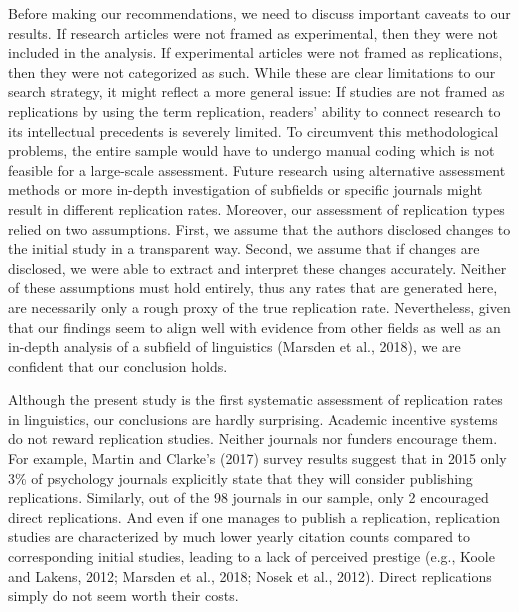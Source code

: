 \documentclass[]{elsarticle} %
\begin{document}
Before making our recommendations, we need to discuss important caveats to our results. If research articles were not framed as experimental, then they were not included in the analysis. If experimental articles were not framed as replications, then they were not categorized as such. While these are clear limitations to our search strategy, it might reflect a more general issue: If studies are not framed as replications by using the term replication, readers' ability to connect research to its intellectual precedents is severely limited. To circumvent this methodological problems, the entire sample would have to undergo manual coding which is not feasible for a large-scale assessment. Future research using alternative assessment methods or more in-depth investigation of subfields or specific journals might result in different replication rates.
Moreover, our assessment of replication types relied on two assumptions. First, we assume that the authors disclosed changes to the initial study in a transparent way. Second, we assume that if changes are disclosed, we were able to extract and interpret these changes accurately. Neither of these assumptions must hold entirely, thus any rates that are generated here, are necessarily only a rough proxy of the true replication rate. Nevertheless, given that our findings seem to align well with evidence from other fields as well as an in-depth analysis of a subfield of linguistics (Marsden et al., 2018), we are confident that our conclusion holds.

Although the present study is the first systematic assessment of replication rates in linguistics, our conclusions are hardly surprising. Academic incentive systems do not reward replication studies. Neither journals nor funders encourage them. For example, Martin and Clarke's (2017) survey results suggest that in 2015 only 3\% of psychology journals explicitly state that they will consider publishing replications. Similarly, out of the 98 journals in our sample, only 2 encouraged direct replications. And even if one manages to publish a replication, replication studies are characterized by much lower yearly citation counts compared to corresponding initial studies, leading to a lack of perceived prestige (e.g., Koole and Lakens, 2012; Marsden et al., 2018; Nosek et al., 2012). Direct replications simply do not seem worth their costs.
\end{document}
